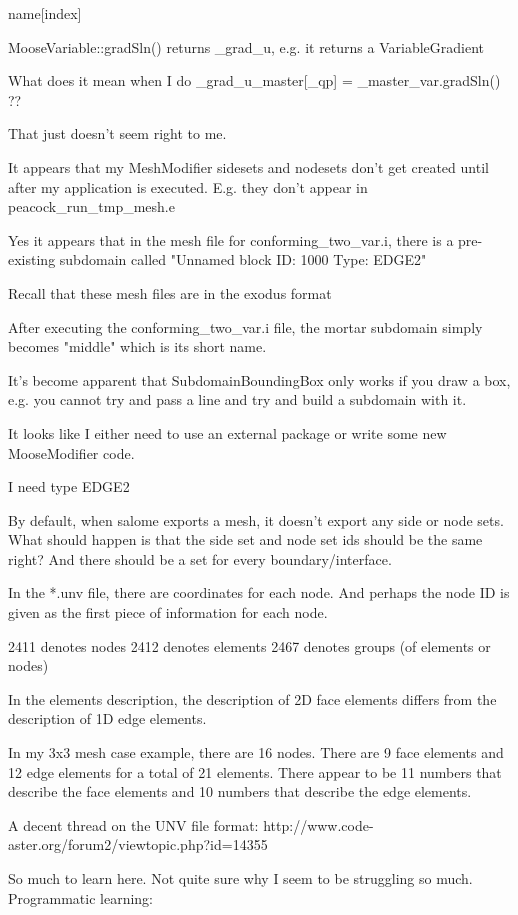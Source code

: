name[index]

MooseVariable::gradSln() returns _grad_u, e.g. it returns a VariableGradient

What does it mean when I do _grad_u_master[_qp] = _master_var.gradSln() ??

That just doesn't seem right to me.

It appears that my MeshModifier sidesets and nodesets don't get created until after my application is executed. E.g. they don't appear in peacock_run_tmp_mesh.e

Yes it appears that in the mesh file for conforming_two_var.i, there is a pre-existing subdomain called "Unnamed block ID: 1000 Type: EDGE2"

Recall that these mesh files are in the exodus format

After executing the conforming_two_var.i file, the mortar subdomain simply becomes "middle" which is its short name.

It's become apparent that SubdomainBoundingBox only works if you draw a box, e.g. you cannot try and pass a line and try and build a subdomain with it.

It looks like I either need to use an external package or write some new MooseModifier code.

I need type EDGE2

By default, when salome exports a mesh, it doesn't export any side or node sets. What should happen is that the side set and node set ids should be the same right? And there should be a set for every boundary/interface.

In the *.unv file, there are coordinates for each node. And perhaps the node ID is given as the first piece of information for each node.

2411 denotes nodes
2412 denotes elements
2467 denotes groups (of elements or nodes)

In the elements description, the description of 2D face elements differs from the description of 1D edge elements.

In my 3x3 mesh case example, there are 16 nodes. There are 9 face elements and 12 edge elements for a total of 21 elements. There appear to be 11 numbers that describe the face elements and 10 numbers that describe the edge elements.

A decent thread on the UNV file format: http://www.code-aster.org/forum2/viewtopic.php?id=14355

So much to learn here. Not quite sure why I seem to be struggling so much. Programmatic learning:

